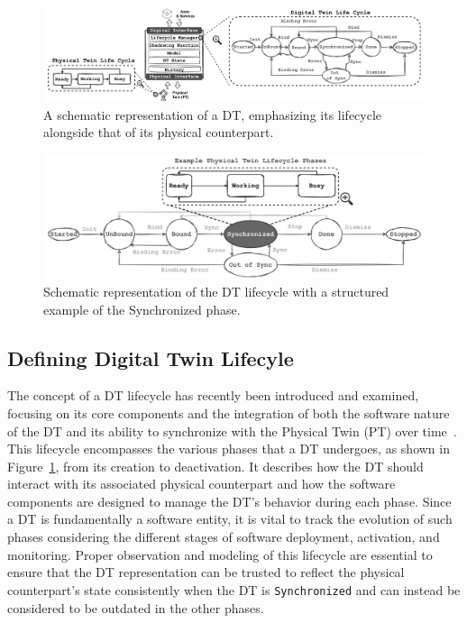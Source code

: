 \begin{figure}[t]
    \setlength{\belowcaptionskip}{-13pt}
    \centering
    \includegraphics[width=\textwidth]{figures/dt-lifecycle/dt_model_lifecycle_dt_pt.pdf}
    \caption{A schematic representation of a DT, emphasizing its lifecycle alongside that of its physical counterpart.}
    \label{fig:dt_model_pt_dt_lifecycles}
\end{figure}


\begin{figure}[t]
    \setlength{\belowcaptionskip}{-13pt}
    \centering
    \includegraphics[width=\textwidth]{figures/dt-lifecycle/dt_lifecycle_pt_sync.pdf}
    \caption{Schematic representation of the DT lifecycle with a structured example of the Synchronized phase.}
    \label{fig:dt_lifecycle_pt_sync}
\end{figure}



\subsection{Defining Digital Twin Lifecyle}

The concept of a DT lifecycle has recently been introduced and examined, focusing on its core components and the integration of both the software nature of the DT and its ability to synchronize with the Physical Twin (PT) over time~\cite{web_of_dt}.
This lifecycle encompasses the various phases that a DT undergoes, as shown in Figure~\ref{fig:dt_model_pt_dt_lifecycles}, from its creation to deactivation. It describes how the DT should interact with its associated physical counterpart and how the software components are designed to manage the DT's behavior during each phase.
Since a DT is fundamentally a software entity, it is vital to track the evolution of such phases considering the different stages of software deployment, activation, and monitoring.
Proper observation and modeling of this lifecycle are essential to ensure that the DT representation can be trusted to reflect the physical counterpart's state consistently when the DT is \texttt{Synchronized} and can instead be considered to be outdated in the other phases.

